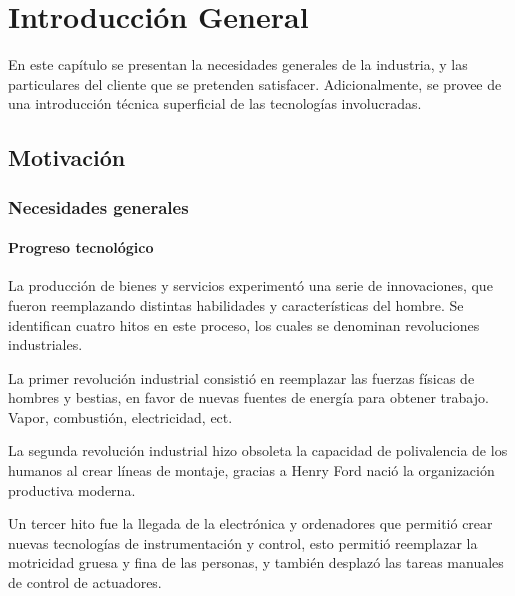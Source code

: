 \chapter{Introducción General}

\label{Chapter1} %
\label{IntroGeneral}


\newcommand{\keyword}[1]{\textbf{#1}}
\newcommand{\tabhead}[1]{\textbf{#1}}
\newcommand{\code}[1]{\texttt{#1}}
\newcommand{\file}[1]{\texttt{\bfseries#1}}
\newcommand{\option}[1]{\texttt{\itshape#1}}
\newcommand{\grados}{$^{\circ}$}


En este capítulo se presentan la necesidades generales de la industria, y las particulares del cliente que se pretenden satisfacer. Adicionalmente, se provee de una introducción técnica superficial de las tecnologías involucradas.

\section{Motivación}
\label{motivacion}

	\subsection{Necesidades generales}

		\subsubsection{Progreso tecnológico}

			La producción de bienes y servicios experimentó una serie de innovaciones, que fueron reemplazando distintas habilidades y características del hombre. Se identifican cuatro hitos en este proceso, los cuales se denominan revoluciones industriales.
		
			La primer revolución industrial consistió en reemplazar las fuerzas físicas de hombres y bestias, en favor de nuevas fuentes de energía para obtener trabajo. Vapor, combustión, electricidad, ect. 

			La segunda revolución industrial hizo obsoleta la capacidad de polivalencia de los humanos al crear líneas de montaje, gracias a Henry Ford nació la organización productiva moderna.

			Un tercer hito fue la llegada de la electrónica y ordenadores que permitió crear nuevas tecnologías de instrumentación y control, esto permitió reemplazar la motricidad gruesa y fina de las personas, y también desplazó las tareas manuales de control de actuadores. 

